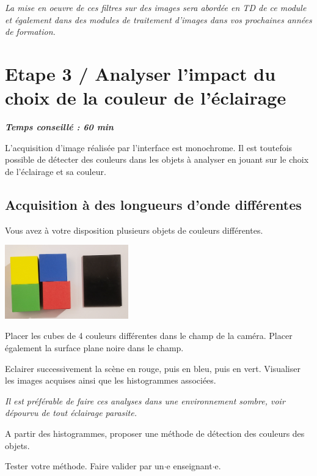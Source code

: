 \documentclass[a4paper,11pt,titlepage]{article} %
\begin{document}
\textit{La mise en oeuvre de ces filtres sur des images sera abordée en TD de ce module et également dans des modules de traitement d'images dans vos prochaines années de formation.}


\newpage
\section{Etape 3 / Analyser l'impact du choix de la couleur de l'éclairage}

\begin{center} \textbf{\textit{Temps conseillé : 60 min}} \end{center}

L'acquisition d'image réalisée par l'interface est monochrome. Il est toutefois possible de détecter des couleurs dans les objets à analyser en jouant sur le choix de l'éclairage et sa couleur.


\subsection{Acquisition à des longueurs d'onde différentes}

Vous avez à votre disposition plusieurs objets de couleurs différentes.

\begin{center}
	\includegraphics[width=0.4\textwidth]{images/cubes.jpg}
\end{center}


\Manip Placer les cubes de 4 couleurs différentes dans le champ de la caméra. Placer également la surface plane noire dans le champ.

\Manip Eclairer successivement la scène en rouge, puis en bleu, puis en vert. Visualiser les images acquises ainsi que les histogrammes associées.

\textit{Il est préférable de faire ces analyses dans une environnement sombre, voir dépourvu de tout éclairage parasite.}

\Quest A partir des histogrammes, proposer une méthode de détection des couleurs des objets.

\Manip Tester votre méthode. Faire valider par un$\cdot$e enseignant$\cdot$e.
\end{document}
